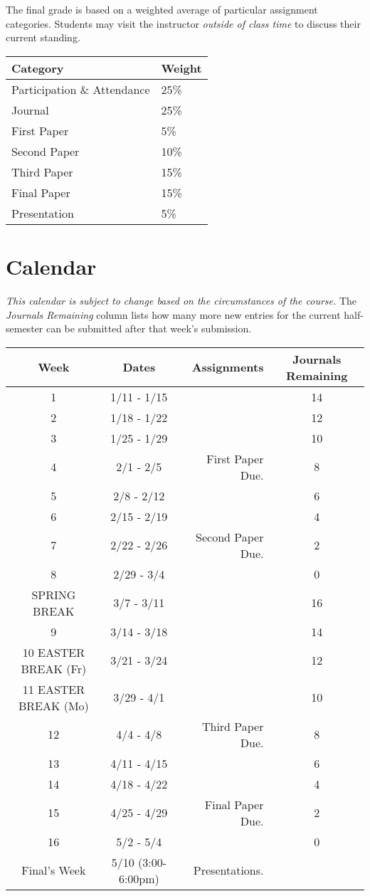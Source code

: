 \documentclass[]{tufte-handout}
\begin{document}
The final grade is based on a weighted average of particular assignment categories.  Students may visit the instructor \textit{outside of class time} to discuss their current standing.  

\begin{center}
\begin{tabular}{ll}
Category & Weight  \\ \hline
Participation \& Attendance & 25\% \\
Journal & 25\% \\
First Paper & 5\% \\
Second Paper & 10\% \\
Third Paper & 15\% \\
Final Paper & 15\% \\
Presentation & 5\% \\
\end{tabular}
\end{center}


\section{Calendar}

\textit{This calendar is subject to change based on the circumstances of the course.}  The \textit{Journals Remaining} column lists how many more new entries for the current half-semester can be submitted after that week's submission.

\begin{center}
\begin{tabular}{|c|c|r|c|}
\hline 
Week & Dates & Assignments & Journals Remaining\\
\hline
1 & 1/11 - 1/15 & & 14 \\
\hline
2 & 1/18 - 1/22 & & 12 \\
\hline
3 & 1/25 - 1/29 & & 10 \\
\hline
4 & 2/1 - 2/5 & First Paper Due. & 8\\
\hline
5 & 2/8 - 2/12 &  & 6\\
\hline
6 & 2/15 - 2/19 &  & 4\\
\hline
7 & 2/22 - 2/26 &  Second Paper Due. & 2 \\
\hline
8 & 2/29 - 3/4 &  & 0 \\
\hline 
SPRING BREAK & 3/7 - 3/11 &  & 16 \\
\hline
9 & 3/14 - 3/18 &  & 14\\
\hline
10 EASTER BREAK (Fr)& 3/21 - 3/24 & & 12 \\
\hline
11 EASTER BREAK (Mo)& 3/29 - 4/1 & & 10 \\
\hline
12 & 4/4 - 4/8 &  Third Paper Due. & 8 \\
\hline
13 & 4/11 - 4/15 &  & 6 \\
\hline
14 & 4/18 - 4/22 &  & 4 \\
\hline
15 & 4/25 - 4/29 & Final Paper Due. & 2\\ 
\hline
16 & 5/2 - 5/4 & & 0 \\
\hline
Final's Week & 5/10 (3:00-6:00pm) & Presentations.  &\\ 
\hline
\end{tabular}
\end{center}
\end{document}
